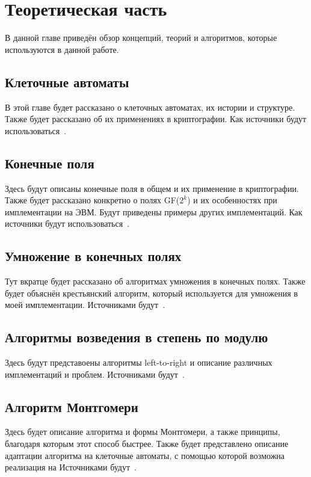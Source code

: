 \documentclass[times,specification,annotation]{itmo-student-thesis}
\begin{document}
\chapter{Теоретическая часть}

В данной главе приведён обзор концепций, теорий и алгоритмов, которые используются в данной работе.


\section{Клеточные автоматы}\label{sec:cells}

В этой главе будет рассказано о клеточных автоматах, их истории и структуре.
Также будет рассказано об их применениях в криптографии.
Как источники будут использоваться~\cite{zhu17, zhu17_2}.

\section{Конечные поля}\label{sec:fields}

Здесь будут описаны конечные поля в общем и их применение в криптографии.
Также будет рассказано конкретно о полях GF($2^k$) и их особенностях при имплементации на ЭВМ.
Будут приведены примеры других имплементаций.
Как источники будут использоваться~\cite{pri16, mau15, knu97}.

\section{Умножение в конечных полях}\label{sec:mult}

Тут вкратце будет рассказано об алгоритмах умножения в конечных полях.
Также будет объяснён крестьянский алгоритм, который используется для умножения в моей имплементации.
Источниками будут~\cite{knu97, men01, koc98}.
\section{Алгоритмы возведения в степень по модулю}\label{sec:exp}

Здесь будут представоены алгоритмы left-to-right и описание различных имплементаций и проблем.
Источниками будут~\cite{knu97, men01, koc97}.
\section{Алгоритм Монтгомери}\label{sec:mont}

Здесь будет описание алгоритма и формы Монтгомери, а также принципы, благодаря которым этот способ быстрее.
Также будет представлено описание адаптации алгоритма на клеточные автоматы, с помощью которой
возможна реализация на
Источниками будут~\cite{jeo07, men01, koc97}.
\end{document}
